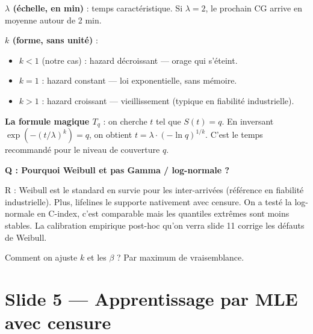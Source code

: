 \documentclass[11pt,a4paper]{article}
\begin{document}
\begin{compr}
\textbf{$\lambda$ (échelle, en min)} : temps caractéristique. Si $\lambda = 2$, le prochain
CG arrive en moyenne autour de 2 min.

\textbf{$k$ (forme, sans unité)} :
\begin{itemize}
    \item $k < 1$ (notre cas) : hazard décroissant — orage qui s'éteint.
    \item $k = 1$ : hazard constant — loi exponentielle, sans mémoire.
    \item $k > 1$ : hazard croissant — vieillissement (typique en fiabilité industrielle).
\end{itemize}

\textbf{La formule magique $T_q$} : on cherche $t$ tel que $S(t) = q$. En inversant
$\exp(-(t/\lambda)^k) = q$, on obtient $t = \lambda \cdot (-\ln q)^{1/k}$. C'est le temps
recommandé pour le niveau de couverture $q$.
\end{compr}

\begin{piege}
\textbf{Q : Pourquoi Weibull et pas Gamma / log-normale ?}

R : Weibull est le standard en survie pour les inter-arrivées (référence en fiabilité
industrielle). Plus, lifelines le supporte nativement avec censure. On a testé la
log-normale en C-index, c'est comparable mais les quantiles extrêmes sont moins stables.
La calibration empirique post-hoc qu'on verra slide 11 corrige les défauts de Weibull.
\end{piege}

\begin{transit}
\og Comment on ajuste $k$ et les $\beta$ ? Par maximum de vraisemblance. \fg{}
\end{transit}

\section{Slide 5 — Apprentissage par MLE avec censure}
\end{document}
